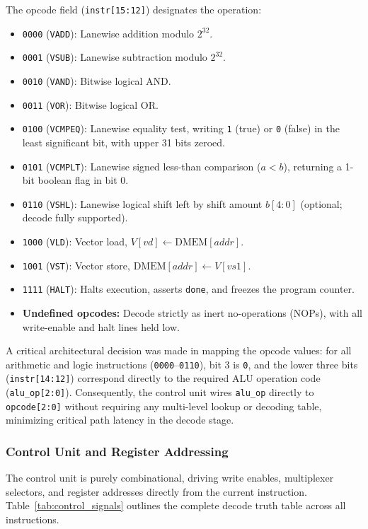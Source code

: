 The opcode field (\texttt{instr[15:12]}) designates the operation:
\begin{itemize}
  \item \texttt{0000} (\texttt{VADD}): Lanewise addition modulo $2^{32}$.
  \item \texttt{0001} (\texttt{VSUB}): Lanewise subtraction modulo $2^{32}$.
  \item \texttt{0010} (\texttt{VAND}): Bitwise logical AND.
  \item \texttt{0011} (\texttt{VOR}): Bitwise logical OR.
  \item \texttt{0100} (\texttt{VCMPEQ}): Lanewise equality test, writing \texttt{1} (true) or \texttt{0} (false) in the least significant bit, with upper 31 bits zeroed.
  \item \texttt{0101} (\texttt{VCMPLT}): Lanewise signed less-than comparison ($a < b$), returning a 1-bit boolean flag in bit 0.
  \item \texttt{0110} (\texttt{VSHL}): Lanewise logical shift left by shift amount $b[4:0]$ (optional; decode fully supported).
  \item \texttt{1000} (\texttt{VLD}): Vector load, $V[vd] \leftarrow \text{DMEM}[addr]$.
  \item \texttt{1001} (\texttt{VST}): Vector store, $\text{DMEM}[addr] \leftarrow V[vs1]$.
  \item \texttt{1111} (\texttt{HALT}): Halts execution, asserts \texttt{done}, and freezes the program counter.
  \item \textbf{Undefined opcodes:} Decode strictly as inert no-operations (NOPs), with all write-enable and halt lines held low.
\end{itemize}

A critical architectural decision was made in mapping the opcode values: for all arithmetic and logic instructions (\texttt{0000}--\texttt{0110}), bit 3 is \texttt{0}, and the lower three bits (\texttt{instr[14:12]}) correspond directly to the required ALU operation code (\texttt{alu\_op[2:0]}). Consequently, the control unit wires \texttt{alu\_op} directly to \texttt{opcode[2:0]} without requiring any multi-level lookup or decoding table, minimizing critical path latency in the decode stage.

\subsubsection{Control Unit and Register Addressing}
The control unit is purely combinational, driving write enables, multiplexer selectors, and register addresses directly from the current instruction. Table~\ref{tab:control_signals} outlines the complete decode truth table across all instructions.

